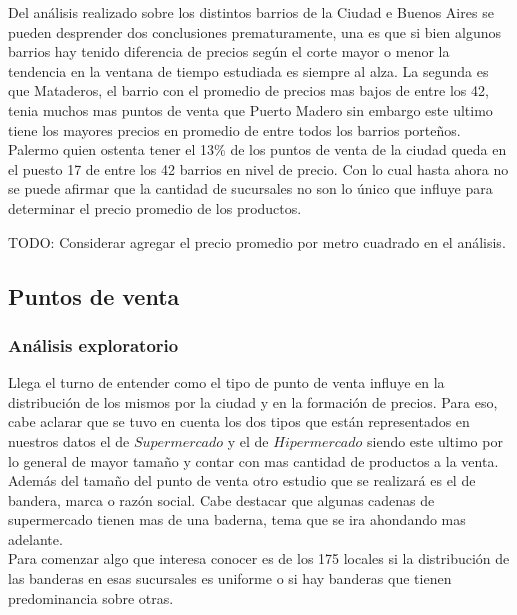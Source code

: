 Del análisis realizado sobre los distintos barrios de la Ciudad e Buenos Aires se pueden desprender dos conclusiones prematuramente, una es que si bien algunos barrios hay tenido diferencia de precios según el corte mayor o menor la tendencia en la ventana de tiempo estudiada es siempre al alza. La segunda es que Mataderos, el barrio con el promedio de precios mas bajos de entre los 42, tenia muchos mas puntos de venta que Puerto Madero sin embargo este ultimo tiene los mayores precios en promedio de entre todos los barrios porteños. Palermo quien ostenta tener el 13\%  de los puntos de venta de la ciudad queda en el puesto 17 de entre los 42 barrios en nivel de precio. Con lo cual hasta ahora no se puede afirmar que la cantidad de sucursales no son lo único que influye para determinar el precio promedio de los productos.

TODO: Considerar agregar el precio promedio por metro cuadrado en el análisis.



\subsection{Puntos de venta}
\subsubsection{Análisis exploratorio}

Llega el turno de entender como el tipo de punto de venta influye en la distribución de los mismos por la ciudad y en la formación de precios. Para eso, cabe aclarar que se tuvo en cuenta los dos tipos que están representados en nuestros datos el de $Supermercado$ y el de $Hipermercado$ siendo este ultimo por lo general de mayor tamaño y contar con mas cantidad de productos a la venta. Además del tamaño del punto de venta otro estudio que se realizará es el de bandera,  marca o razón social. Cabe destacar que algunas cadenas de supermercado tienen mas de una baderna, tema que se ira ahondando mas adelante.\\
Para comenzar algo que interesa conocer es de los 175 locales si la distribución de las banderas en esas sucursales es uniforme o si hay banderas que tienen predominancia sobre otras.


